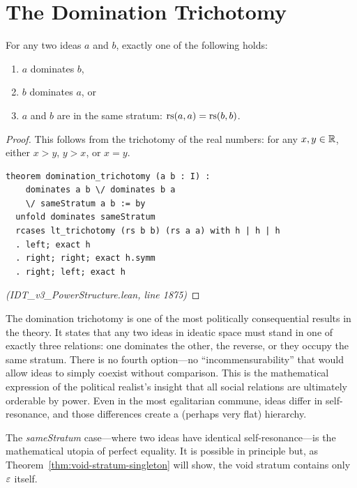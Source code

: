 \section{The Domination Trichotomy}

\begin{theorem}
\label{thm:domination-trichotomy}
For any two ideas $a$ and $b$, exactly one of the following holds:
\begin{enumerate}
  \item $a$ dominates $b$,
  \item $b$ dominates $a$, or
  \item $a$ and $b$ are in the same stratum: $\mathrm{rs}(a,a) = \mathrm{rs}(b,b)$.
\end{enumerate}
\end{theorem}

\begin{proof}
This follows from the trichotomy of the real numbers: for any $x, y \in \mathbb{R}$,
either $x > y$, $y > x$, or $x = y$.
\begin{lstlisting}
theorem domination_trichotomy (a b : I) :
    dominates a b \/ dominates b a
    \/ sameStratum a b := by
  unfold dominates sameStratum
  rcases lt_trichotomy (rs b b) (rs a a) with h | h | h
  . left; exact h
  . right; right; exact h.symm
  . right; left; exact h
\end{lstlisting}
\textit{(IDT\_v3\_PowerStructure.lean, line 1875)}
\end{proof}

\begin{interpretation}
The domination trichotomy is one of the most politically consequential results
in the theory. It states that any two ideas in ideatic space must stand in one
of exactly three relations: one dominates the other, the reverse, or they
occupy the same stratum. There is no fourth option---no ``incommensurability''
that would allow ideas to simply coexist without comparison. This is the
mathematical expression of the political realist's insight that all social
relations are ultimately orderable by power. Even in the most egalitarian
commune, ideas differ in self-resonance, and those differences create a
(perhaps very flat) hierarchy.

The \emph{sameStratum} case---where two ideas have identical
self-resonance---is the mathematical utopia of perfect equality. It is
possible in principle but, as Theorem~\ref{thm:void-stratum-singleton}
will show, the void stratum contains only $\varepsilon$ itself.
\end{interpretation}

